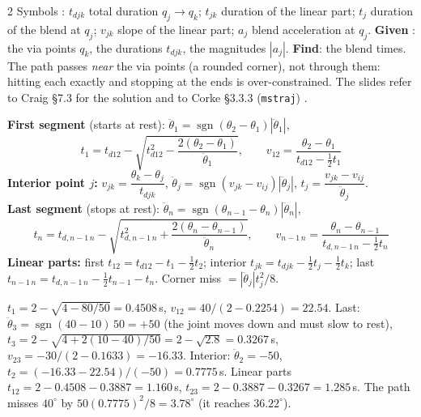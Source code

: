 \begin{multicols}{2}
\nopagebreak[4]
Symbols : $t_{djk}$ total duration $q_j\to q_k$; $t_{jk}$ duration of the linear part; $t_j$ duration of the blend at $q_j$; $v_{jk}$ slope of the linear part; $a_j$ blend acceleration at $q_j$. \textbf{Given} : the via points $q_k$, the durations $t_{djk}$, the magnitudes $|a_j|$. \textbf{Find}: the blend times. The path passes \emph{near} the via points (a rounded corner), not through them: hitting each exactly and stopping at the ends is over-constrained. The slides refer to Craig \S7.3 for the solution and to Corke \S3.3.3 (\texttt{mstraj}) .
\begin{fbx}
\textbf{First segment} (starts at rest): $\ddot\theta_1=\operatorname{sgn}(\theta_2-\theta_1)|\ddot\theta_1|$,
\[t_1=t_{d12}-\sqrt{t_{d12}^2-\frac{2(\theta_2-\theta_1)}{\ddot\theta_1}},\qquad v_{12}=\frac{\theta_2-\theta_1}{t_{d12}-\tfrac12t_1}\]
\textbf{Interior point $j$:} $v_{jk}=\dfrac{\theta_k-\theta_j}{t_{djk}}$, $\ddot\theta_j=\operatorname{sgn}(v_{jk}-v_{ij})|\ddot\theta_j|$, $t_j=\dfrac{v_{jk}-v_{ij}}{\ddot\theta_j}$.\\
\textbf{Last segment} (stops at rest): $\ddot\theta_n=\operatorname{sgn}(\theta_{n-1}-\theta_n)|\ddot\theta_n|$,
\[t_n=t_{d,n-1\,n}-\sqrt{t_{d,n-1\,n}^2+\frac{2(\theta_n-\theta_{n-1})}{\ddot\theta_n}},\qquad v_{n-1\,n}=\frac{\theta_n-\theta_{n-1}}{t_{d,n-1\,n}-\tfrac12t_n}\]
\textbf{Linear parts:} first $t_{12}=t_{d12}-t_1-\tfrac12t_2$; interior $t_{jk}=t_{djk}-\tfrac12t_j-\tfrac12t_k$; last $t_{n-1\,n}=t_{d,n-1\,n}-\tfrac12t_{n-1}-t_n$. Corner miss $=|\ddot\theta_j|t_j^2/8$.
\end{fbx}
\begin{worked}[built from these formulas: $\theta=0^\circ,40^\circ,10^\circ$; $t_d=2,2$\,s; $|\ddot\theta|=50^\circ/$s$^2$ at all three]
$t_1=2-\sqrt{4-80/50}=0.4508$\,s, $v_{12}=40/(2-0.2254)=22.54$. Last: $\ddot\theta_3=\operatorname{sgn}(40-10)\,50=+50$ (the joint moves down and must slow to rest), $t_3=2-\sqrt{4+2(10-40)/50}=2-\sqrt{2.8}=0.3267$\,s, $v_{23}=-30/(2-0.1633)=-16.33$. Interior: $\ddot\theta_2=-50$, $t_2=(-16.33-22.54)/(-50)=0.7775$\,s. Linear parts $t_{12}=2-0.4508-0.3887=1.160$\,s, $t_{23}=2-0.3887-0.3267=1.285$\,s. The path misses $40^\circ$ by $50(0.7775)^2/8=3.78^\circ$ (it reaches $36.22^\circ$). \chk
\end{worked}


\end{multicols}

